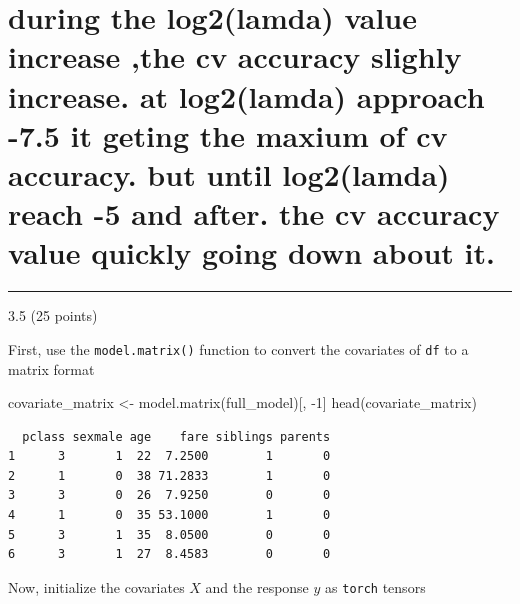 \documentclass[
  letterpaper,
  DIV=11,
  numbers=noendperiod]{scrartcl}
\newenvironment{Shaded}{\begin{snugshade}}{\end{snugshade}}
\newcommand{\AttributeTok}[1]{\textcolor[rgb]{0.40,0.45,0.13}{#1}}
\newcommand{\CommentTok}[1]{\textcolor[rgb]{0.37,0.37,0.37}{#1}}
\newcommand{\DecValTok}[1]{\textcolor[rgb]{0.68,0.00,0.00}{#1}}
\newcommand{\FunctionTok}[1]{\textcolor[rgb]{0.28,0.35,0.67}{#1}}
\newcommand{\NormalTok}[1]{\textcolor[rgb]{0.00,0.23,0.31}{#1}}
\newcommand{\OtherTok}[1]{\textcolor[rgb]{0.00,0.23,0.31}{#1}}
\newcommand{\SpecialCharTok}[1]{\textcolor[rgb]{0.37,0.37,0.37}{#1}}
\begin{document}
\hypertarget{during-the-log2lamda-value-increase-the-cv-accuracy-slighly-increase.-at-log2lamda-approach--7.5-it-geting-the-maxium-of-cv-accuracy.-but-until-log2lamda-reach--5-and-after.-the-cv-accuracy-value-quickly-going-down-about-it.}{%
\section{during the log2(lamda) value increase ,the cv accuracy slighly
increase. at log2(lamda) approach -7.5 it geting the maxium of cv
accuracy. but until log2(lamda) reach -5 and after. the cv accuracy
value quickly going down about
it.}\label{during-the-log2lamda-value-increase-the-cv-accuracy-slighly-increase.-at-log2lamda-approach--7.5-it-geting-the-maxium-of-cv-accuracy.-but-until-log2lamda-reach--5-and-after.-the-cv-accuracy-value-quickly-going-down-about-it.}}

\begin{center}\rule{0.5\linewidth}{0.5pt}\end{center}

3.5 (25 points)

First, use the \texttt{model.matrix()} function to convert the
covariates of \texttt{df} to a matrix format

\begin{Shaded}
\begin{Highlighting}[]
\NormalTok{covariate\_matrix }\OtherTok{\textless{}{-}} \FunctionTok{model.matrix}\NormalTok{(full\_model)[, }\SpecialCharTok{{-}}\DecValTok{1}\NormalTok{]}
\FunctionTok{head}\NormalTok{(covariate\_matrix)}
\end{Highlighting}
\end{Shaded}

\begin{verbatim}
  pclass sexmale age    fare siblings parents
1      3       1  22  7.2500        1       0
2      1       0  38 71.2833        1       0
3      3       0  26  7.9250        0       0
4      1       0  35 53.1000        1       0
5      3       1  35  8.0500        0       0
6      3       1  27  8.4583        0       0
\end{verbatim}

Now, initialize the covariates \(X\) and the response \(y\) as
\texttt{torch} tensors

\begin{Shaded}
\end{Shaded}
\end{document}
